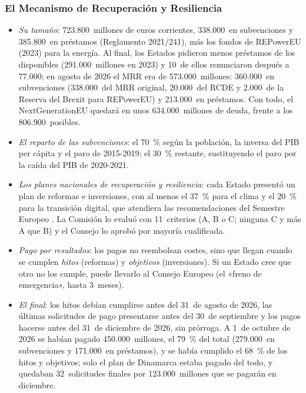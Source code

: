 \documentclass[11pt]{article}
\begin{document}
\subsubsection{El Mecanismo de Recuperación y Resiliencia}\label{sec:mrr}

\begin{itemize}
\item \emph{Su tamaño}: 723.800~millones de euros corrientes, 338.000~en subvenciones y 385.800~en préstamos (Reglamento 2021/241), más los fondos de REPowerEU (2023) para la energía. Al final, los Estados pidieron menos préstamos de los disponibles (291.000~millones en 2023) y 10~de ellos renunciaron después a 77.000; en agosto de 2026 el MRR era de 573.000~millones: 360.000~en subvenciones (338.000~del MRR original, 20.000~del RCDE y 2.000~de la Reserva del Brexit para REPowerEU) y 213.000~en préstamos\nocite{CE2026NGEU}. Con todo, el NextGenerationEU quedará en unos 634.000~millones de deuda, frente a los 806.900~posibles.
\item \emph{El reparto de las subvenciones}: el 70~\% según la población, la inversa del PIB per cápita y el paro de 2015-2019; el 30~\% restante, sustituyendo el paro por la caída del PIB de 2020-2021.
\item \emph{Los planes nacionales de recuperación y resiliencia}: cada Estado presentó un plan de reformas e inversiones, con al menos el 37~\% para el clima y el 20~\% para la transición digital, que atendiera las recomendaciones del Semestre Europeo . La Comisión lo evaluó con 11~criterios (A, B o C; ninguna C y más A que B) y el Consejo lo aprobó por mayoría cualificada.
\item \emph{Pago por resultados}: los pagos no reembolsan costes, sino que llegan cuando se cumplen \emph{hitos} (reformas) y \emph{objetivos} (inversiones). Si un Estado cree que otro no los cumple, puede llevarlo al Consejo Europeo (el «freno de emergencia», hasta 3~meses).
\item \emph{El final}: los hitos debían cumplirse antes del 31~de agosto de 2026, las últimas solicitudes de pago presentarse antes del 30~de septiembre y los pagos hacerse antes del 31~de diciembre de 2026, sin prórroga\nocite{CE2025Camino2026}. A 1~de octubre de 2026 se habían pagado 450.000~millones, el 79~\% del total (279.000~en subvenciones y 171.000~en préstamos), y se había cumplido el 68~\% de los hitos y objetivos; solo el plan de Dinamarca estaba pagado del todo, y quedaban 32~solicitudes finales por 123.000~millones que se pagarán en diciembre\nocite{CE2026InformeMRR}.
\end{itemize}
\end{document}
